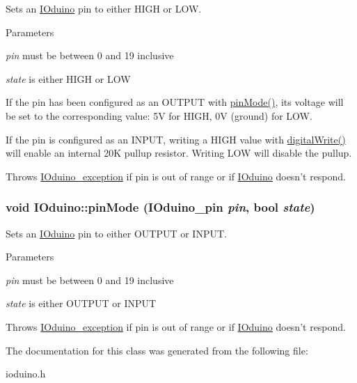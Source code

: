Sets an \hyperlink{classIOduino}{IOduino} pin to either HIGH or LOW. 


\begin{DoxyParams}{Parameters}
\item[{\em pin}]must be between 0 and 19 inclusive \item[{\em state}]is either HIGH or LOW\end{DoxyParams}
If the pin has been configured as an OUTPUT with \hyperlink{classIOduino_a93d15fb0da35a535f8010c1123be2c2c}{pinMode()}, its voltage will be set to the corresponding value: 5V for HIGH, 0V (ground) for LOW.

If the pin is configured as an INPUT, writing a HIGH value with \hyperlink{classIOduino_ab24475bba0e8ddea4257a561a3b21263}{digitalWrite()} will enable an internal 20K pullup resistor. Writing LOW will disable the pullup.

Throws \hyperlink{classIOduino__exception}{IOduino\_\-exception} if pin is out of range or if \hyperlink{classIOduino}{IOduino} doesn't respond. \hypertarget{classIOduino_a93d15fb0da35a535f8010c1123be2c2c}{
\subsubsection[{pinMode}]{\setlength{\rightskip}{0pt plus 5cm}void IOduino::pinMode (IOduino\_\-pin {\em pin}, \/  bool {\em state})}}
\label{classIOduino_a93d15fb0da35a535f8010c1123be2c2c}


Sets an \hyperlink{classIOduino}{IOduino} pin to either OUTPUT or INPUT. 


\begin{DoxyParams}{Parameters}
\item[{\em pin}]must be between 0 and 19 inclusive \item[{\em state}]is either OUTPUT or INPUT\end{DoxyParams}
Throws \hyperlink{classIOduino__exception}{IOduino\_\-exception} if pin is out of range or if \hyperlink{classIOduino}{IOduino} doesn't respond. 

The documentation for this class was generated from the following file:\begin{DoxyCompactItemize}
\item 
ioduino.h\end{DoxyCompactItemize}
